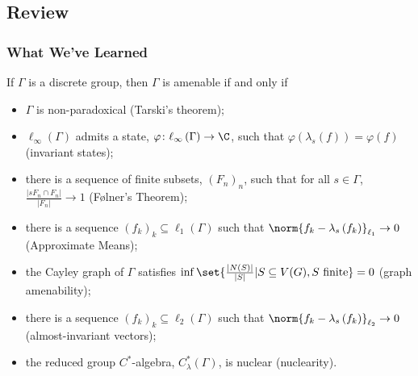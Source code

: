 \documentclass{beamer-custom}
\begin{document}
\subsection{Review}%
\begin{frame}
  \frametitle{What We've Learned}
  \small
  If $\Gamma$ is a discrete group, then $\Gamma$ is amenable if and only if\pause
  \begin{itemize}
    \item $\Gamma$ is non-paradoxical (Tarski's theorem);\pause
    \item $\ell_{\infty}\left( \Gamma \right)$ admits a state, $\varphi\colon \ell_{\infty}\left( \Gamma \right)\rightarrow \C$, such that $\varphi\left( \lambda_s(f) \right) = \varphi\left( f \right)$ (invariant states);\pause
    \item there is a sequence of finite subsets, $\left( F_n \right)_n$, such that for all $s\in\Gamma$, $\frac{\left\vert sF_n\cap F_n \right\vert}{\left\vert F_n \right\vert} \rightarrow 1$ (Følner's Theorem);\pause
    \item there is a sequence $\left( f_k \right)_k\subseteq \ell_1\left( \Gamma \right)$ such that $\norm{f_k - \lambda_s\left(f_k\right)}_{\ell_1}\rightarrow 0$ (Approximate Means);\pause
    \item the Cayley graph of $\Gamma$ satisfies $\inf\set{\frac{\left\vert N(S) \right\vert}{\left\vert S \right\vert} | S\subseteq V(G),S\text{ finite}} = 0$ (graph amenability);\pause
    \item there is a sequence $\left( f_k \right)_k\subseteq \ell_2\left( \Gamma \right)$ such that $\norm{f_k - \lambda_s\left(f_k\right)}_{\ell_2} \rightarrow 0$ (almost-invariant vectors);\pause
    \item the reduced group $C^{\ast}$-algebra, $C^{\ast}_{\lambda}\left( \Gamma \right)$, is nuclear (nuclearity).
  \end{itemize}
\end{frame}
\end{document}
